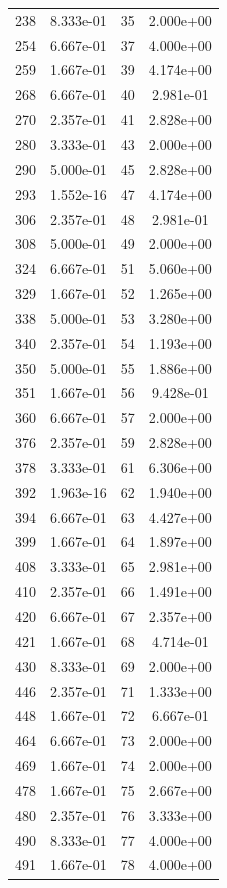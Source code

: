 \documentclass[12pt]{article}
\begin{document}
\begin{longtable}{@{}cccc@{}}
238 & 8.333e-01 & 35 & 2.000e+00 \\
254 & 6.667e-01 & 37 & 4.000e+00 \\
259 & 1.667e-01 & 39 & 4.174e+00 \\
268 & 6.667e-01 & 40 & 2.981e-01 \\
270 & 2.357e-01 & 41 & 2.828e+00 \\
280 & 3.333e-01 & 43 & 2.000e+00 \\
290 & 5.000e-01 & 45 & 2.828e+00 \\
293 & 1.552e-16 & 47 & 4.174e+00 \\
306 & 2.357e-01 & 48 & 2.981e-01 \\
308 & 5.000e-01 & 49 & 2.000e+00 \\
324 & 6.667e-01 & 51 & 5.060e+00 \\
329 & 1.667e-01 & 52 & 1.265e+00 \\
338 & 5.000e-01 & 53 & 3.280e+00 \\
340 & 2.357e-01 & 54 & 1.193e+00 \\
350 & 5.000e-01 & 55 & 1.886e+00 \\
351 & 1.667e-01 & 56 & 9.428e-01 \\
360 & 6.667e-01 & 57 & 2.000e+00 \\
376 & 2.357e-01 & 59 & 2.828e+00 \\
378 & 3.333e-01 & 61 & 6.306e+00 \\
392 & 1.963e-16 & 62 & 1.940e+00 \\
394 & 6.667e-01 & 63 & 4.427e+00 \\
399 & 1.667e-01 & 64 & 1.897e+00 \\
408 & 3.333e-01 & 65 & 2.981e+00 \\
410 & 2.357e-01 & 66 & 1.491e+00 \\
420 & 6.667e-01 & 67 & 2.357e+00 \\
421 & 1.667e-01 & 68 & 4.714e-01 \\
430 & 8.333e-01 & 69 & 2.000e+00 \\
446 & 2.357e-01 & 71 & 1.333e+00 \\
448 & 1.667e-01 & 72 & 6.667e-01 \\
464 & 6.667e-01 & 73 & 2.000e+00 \\
469 & 1.667e-01 & 74 & 2.000e+00 \\
478 & 1.667e-01 & 75 & 2.667e+00 \\
480 & 2.357e-01 & 76 & 3.333e+00 \\
490 & 8.333e-01 & 77 & 4.000e+00 \\
491 & 1.667e-01 & 78 & 4.000e+00 \\

\end{longtable}
\end{document}
